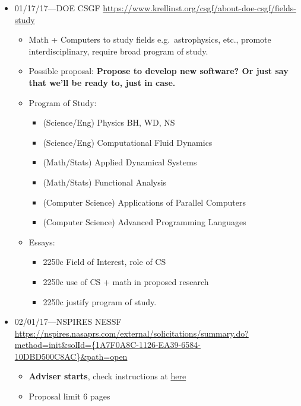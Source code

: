 \documentclass[11pt,
        usenames, %
        dvipsnames %
    ]{article}
\begin{document}
\begin{itemize}
    \item 01/17/17---DOE CSGF \url{
        https://www.krellinst.org/csgf/about-doe-csgf/fields-study}
        \begin{itemize}
            \item Math + Computers to study fields e.g.\ astrophysics, etc.,
                promote interdisciplinary, require broad program of study.
            \item Possible proposal: \textbf{Propose to develop new software? Or
                just say that we'll be ready to, just in case.}
            \item Program of Study:
                \begin{itemize}
                    \item (Science/Eng) Physics BH, WD, NS
                    \item (Science/Eng) Computational Fluid Dynamics
                    \item (Math/Stats) Applied Dynamical Systems
                    \item (Math/Stats) Functional Analysis
                    \item (Computer Science) Applications of Parallel Computers
                    \item (Computer Science) Advanced Programming Languages
                \end{itemize}
            \item Essays:
                \begin{itemize}
                    \item 2250c Field of Interest, role of CS
                    \item 2250c use of CS + math in proposed research
                    \item 2250c justify program of study.
                \end{itemize}
        \end{itemize}
    \item 02/01/17---NSPIRES NESSF \url{
        https://nspires.nasaprs.com/external/solicitations/summary.do?method=init&solId={1A7F0A8C-1126-EA39-6584-10DBD500C8AC}&path=open
        }
        \begin{itemize}
            \item \textbf{Adviser starts}, check instructions at \href{
                https://nspires.nasaprs.com/external/viewrepositorydocument/cmdocumentid=539448/solicitationId=\%7B1A7F0A8C-1126-EA39-6584-10DBD500C8AC\%7D/viewSolicitationDocument=1/NESSF\%202017-2018\%20Proposal\%20Submission\%20Instructions.pdf}{here}
            \item Proposal limit 6 pages
        \end{itemize}
\end{itemize}
\end{document}
